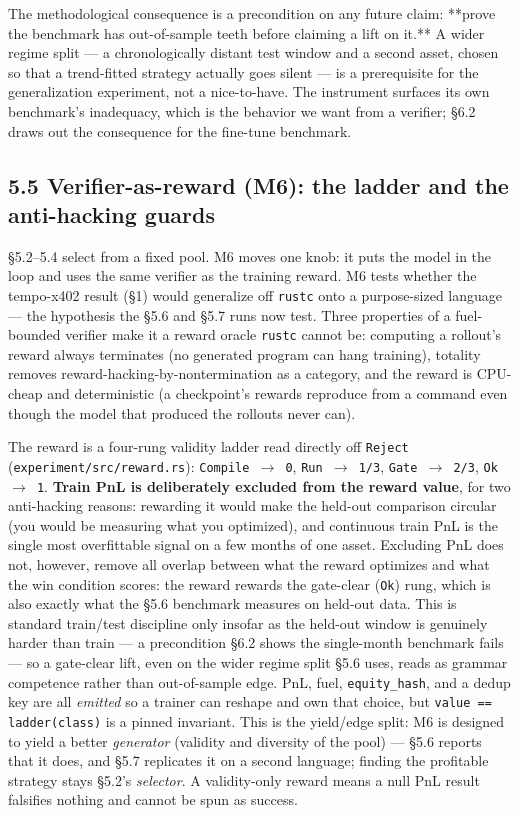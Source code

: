 \documentclass[11pt]{article}
\newcommand{\code}[1]{\texttt{#1}}
\begin{document}
The methodological consequence is a precondition on any future claim: **prove
the benchmark has out-of-sample teeth before claiming a lift on it.** A wider
regime split --- a chronologically distant test window and a second asset, chosen
so that a trend-fitted strategy actually goes silent --- is a prerequisite for the
generalization experiment, not a nice-to-have. The instrument surfaces its own
benchmark's inadequacy, which is the behavior we want from a verifier; \S{}6.2
draws out the consequence for the fine-tune benchmark.

\subsection*{5.5 Verifier-as-reward (M6): the ladder and the anti-hacking guards}

\S{}5.2--5.4 select from a fixed pool. M6 moves one knob: it puts the model in the
loop and uses the same verifier as the training reward. M6 tests whether the
tempo-x402 result (\S{}1) would generalize off \code{rustc} onto a purpose-sized
language --- the hypothesis the \S{}5.6 and \S{}5.7 runs now test. Three properties of a fuel-bounded verifier make it a reward oracle
\code{rustc} cannot be: computing a rollout's reward always terminates (no generated
program can hang training), totality removes reward-hacking-by-nontermination as
a category, and the reward is CPU-cheap and deterministic (a checkpoint's
rewards reproduce from a command even though the model that produced the
rollouts never can).

The reward is a four-rung validity ladder read directly off \code{Reject}
(\code{experiment/src/reward.rs}): \code{Compile $\rightarrow$ 0}, \code{Run $\rightarrow$ 1/3}, \code{Gate $\rightarrow$ 2/3},
\code{Ok $\rightarrow$ 1}. \textbf{Train PnL is deliberately excluded from the reward value}, for two
anti-hacking reasons: rewarding it would make the held-out comparison circular
(you would be measuring what you optimized), and continuous train PnL is the
single most overfittable signal on a few months of one asset. Excluding PnL does
not, however, remove all overlap between what the reward optimizes and what the
win condition scores: the reward rewards the gate-clear (\code{Ok}) rung, which is
also exactly what the \S{}5.6 benchmark measures on held-out data. This is
standard train/test discipline only insofar as the held-out window is genuinely
harder than train --- a precondition \S{}6.2 shows the single-month benchmark fails ---
so a gate-clear lift, even on the wider regime split \S{}5.6 uses, reads as grammar
competence rather than out-of-sample edge. PnL, fuel, \code{equity\_hash}, and a dedup key are all \emph{emitted} so
a trainer can reshape and own that choice, but \code{value == ladder(class)} is a
pinned invariant. This is the yield/edge split: M6 is designed to yield a better
\emph{generator} (validity and diversity of the pool) --- \S{}5.6 reports that it does,
and \S{}5.7 replicates it on a second language; finding the profitable strategy
stays \S{}5.2's \emph{selector}. A validity-only reward means a null PnL result falsifies nothing and
cannot be spun as success.
\end{document}
